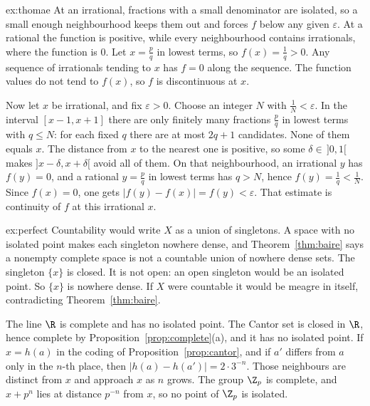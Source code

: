 \begin{solution}{ex:thomae}
\idea At an irrational, fractions with a small denominator are isolated, so a small enough neighbourhood keeps them out and forces $f$ below any given $\varepsilon$. At a rational the function is positive, while every neighbourhood contains irrationals, where the function is $0$.
\writeup Let $x=\frac pq$ in lowest terms, so $f(x)=\frac1q>0$. Any sequence of irrationals tending to $x$ has $f=0$ along the sequence. The function values do not tend to $f(x)$, so $f$ is discontinuous at $x$.

Now let $x$ be irrational, and fix $\varepsilon>0$. Choose an integer $N$ with $\frac1N<\varepsilon$. In the interval $[x-1,x+1]$ there are only finitely many fractions $\frac pq$ in lowest terms with $q\le N$: for each fixed $q$ there are at most $2q+1$ candidates. None of them equals $x$. The distance from $x$ to the nearest one is positive, so some $\delta\in\,]0,1[$ makes $]x-\delta,x+\delta[$ avoid all of them. On that neighbourhood, an irrational $y$ has $f(y)=0$, and a rational $y=\frac pq$ in lowest terms has $q>N$, hence $f(y)=\frac1q<\frac1N$. Since $f(x)=0$, one gets $|f(y)-f(x)|=f(y)<\varepsilon$. That estimate is continuity of $f$ at this irrational $x$.
\end{solution}

\begin{solution}{ex:perfect}
\idea Countability would write $X$ as a union of singletons. A space with no isolated point makes each singleton nowhere dense, and Theorem~\ref{thm:baire} says a nonempty complete space is not a countable union of nowhere dense sets.
\writeup The singleton $\{x\}$ is closed. It is not open: an open singleton would be an isolated point. So $\{x\}$ is nowhere dense. If $X$ were countable it would be meagre in itself, contradicting Theorem~\ref{thm:baire}.

The line $\R$ is complete and has no isolated point. The Cantor set is closed in $\R$, hence complete by Proposition~\ref{prop:complete}(a), and it has no isolated point. If $x=h(a)$ in the coding of Proposition~\ref{prop:cantor}, and if $a'$ differs from $a$ only in the $n$-th place, then $|h(a)-h(a')|=2\cdot3^{-n}$. Those neighbours are distinct from $x$ and approach $x$ as $n$ grows. The group $\Z_p$ is complete, and $x+p^n$ lies at distance $p^{-n}$ from $x$, so no point of $\Z_p$ is isolated.
\end{solution}

